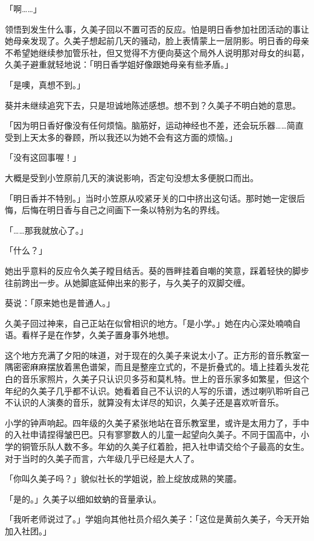 \documentclass[UTF8]{ctexart}
\begin{document}
    「啊……」 

    领悟到发生什么事，久美子回以不置可否的反应。怕是明日香参加社团活动的事让她母亲发现了。久美子想起前几天的骚动，脸上表情蒙上一层阴影。明日香的母亲不希望她继续参加管乐社，但又觉得不方便向葵这个局外人说明那对母女的纠葛，久美子避重就轻地说：「明日香学姐好像跟她母亲有些矛盾。」 

    「是噢，真想不到。」 

    葵并未继续追究下去，只是坦诚地陈述感想。想不到？久美子不明白她的意思。 

    「因为明日香好像没有任何烦恼。脑筋好，运动神经也不差，还会玩乐器……简直受到上天太多的眷顾，所以我还以为她不会有这方面的烦恼。」 

    「没有这回事喔！」 

    大概是受到小笠原前几天的演说影响，否定句没想太多便脱口而出。 

    「明日香并不特别。」当时小笠原从咬紧牙关的口中挤出这句话。那时她一定很后悔，后悔在明日香与自己之间画下一条以特别为名的界线。 

    「……那我就放心了。」 

    「什么？」 

    她出乎意料的反应令久美子瞠目结舌。葵的唇畔挂着自嘲的笑意，踩着轻快的脚步往前跨出一步。从她脚底延伸出来的影子，与久美子的双脚交缠。 

    葵说：「原来她也是普通人。」 

    久美子回过神来，自己正站在似曾相识的地方。「是小学。」她在内心深处喃喃自语。看样子是在作梦，久美子置身事外地想。 

    这个地方充满了夕阳的味道，对于现在的久美子来说太小了。正方形的音乐教室一隅密密麻麻摆放着黑色谱架，而且是整座立式的，不是折叠式的。墙上挂着头发花白的音乐家照片，久美子只认识贝多芬和莫札特。世上的音乐家多如繁星，但这个年纪的久美子几乎都不认识。她看着自己不认识的人写的乐谱，透过喇叭聆听自己不认识的人演奏的音乐，就算没有太详尽的知识，久美子还是喜欢听音乐。 

    小学的钟声响起。四年级的久美子紧张地站在音乐教室里，或许是太用力了，手中的入社申请捏得皱巴巴。只有寥寥数人的儿童一起望向久美子。不同于国高中，小学的铜管乐队人数不多。年幼的久美子红着脸，把入社申请交给个子最高的女生。对于当时的久美子而言，六年级几乎已经是大人了。 

    「你叫久美子吗？」貌似社长的学姐说，脸上绽放成熟的笑靥。 

    「是的。」久美子以细如蚊蚋的音量承认。 

    「我听老师说过了。」学姐向其他社员介绍久美子：「这位是黄前久美子，今天开始加入社团。」 
\end{document}
